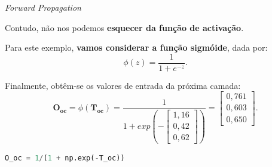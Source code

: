 \begin{frame}[fragile]{\textit{Forward Propagation} \cont}

    Contudo, não nos podemos \textbf{esquecer da função de activação}.
    
    Para este exemplo, \textbf{vamos considerar a função sigmóide}, dada por:
    \begin{equation}
       \phi(z) = \frac{1}{1+e^{-z}}. 
    \end{equation}
    
    \pauseskip
    
    Finalmente, obtêm-se os valores de entrada da próxima camada:
    \begin{equation}
        \mathbf{O_{\text{oc}}} = \phi(\mathbf{T_{\text{oc}}}) =  \frac{1}{1+exp\left ({-\begin{bmatrix}
            1,16\\ 
            0,42\\ 
            0,62
        \end{bmatrix}} \right )}
        = 
        \begin{bmatrix}
            0,761\\ 
            0,603\\ 
            0,650
        \end{bmatrix}.
    \end{equation}
    
    \bigskip
    
    \begin{lstlisting}[language=Python]
O_oc = 1/(1 + np.exp(-T_oc))\end{lstlisting}
    
\end{frame}

